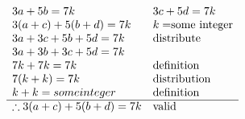 \documentclass[letterpaper]{article}
\begin{document}
	\section{}
    	\begin{displaymath}
    		\begin{array}{ll}
            	3a + 5b = 7k & 3c + 5d = 7k\\
                3(a + c) + 5(b + d) = 7k & k = $some integer$\\
                3a + 3c + 5b + 5d = 7k & $distribute$\\
                3a + 3b + 3c + 5d = 7k & \\
                7k + 7k = 7k & $definition$\\
                7(k + k) = 7k & $distribution$\\
                k + k = some integer & $definition$\\
                \hline
                \therefore 3(a + c) + 5(b+d) = 7k & $valid$\\
    		\end{array}
    	\end{displaymath}
\end{document}
